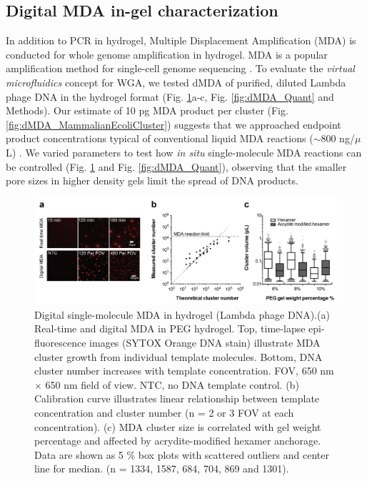 \subsection{Digital MDA in-gel characterization}
In addition to PCR in hydrogel, Multiple Displacement Amplification (MDA) is conducted for whole genome amplification in hydrogel. MDA \cite{Dean:2002us} is a popular amplification method for single-cell genome sequencing \cite{Marcy:2007il,Fu:2015gl,Zhang:2006hq,Raghunathan:2005fg,Pamp:2012cj,Dodsworth:2013ih,Hess:2011gu}. To evaluate the \textit{virtual microfluidics} concept for WGA, we tested dMDA \cite{Morinishi:2015jx,Blainey:2011dt} of purified, diluted Lambda phage DNA in the hydrogel format (Fig. \ref{fig:dMDA}a-c, Fig. \ref{fig:dMDA_Quant} and Methods). Our estimate of 10 pg MDA product per cluster (Fig. \ref{fig:dMDA_MammalianEcoliCluster}) suggests that we approached endpoint product concentrations typical of conventional liquid MDA reactions (\ensuremath{\sim}800 ng\slash $\mu$L) \cite{Blainey:2013dp}. We varied parameters to test how \textit{in situ} single-molecule MDA reactions can be controlled (Fig. \ref{fig:dMDA} and Fig. \ref{fig:dMDA_Quant}), observing that the smaller pore sizes in higher density gels limit the spread of DNA products.

\begin{figure}
\centering
\includegraphics[keepaspectratio,width=1\textwidth]{./figures/Thesis-21.png}
\caption[Digital single-molecule MDA in hydrogel (Lambda phage DNA).]{Digital single-molecule MDA in hydrogel (Lambda phage DNA).(a) Real-time and digital MDA in PEG hydrogel. Top, time-lapse
epi-fluorescence images (SYTOX Orange DNA stain) illustrate MDA cluster growth from individual template molecules. Bottom, DNA cluster number increases with template concentration. FOV, 650 nm $\times$ 650 nm field of view. NTC, no DNA template control. (b) Calibration curve illustrates linear relationship between template concentration and cluster number (n = 2 or 3 FOV at
each concentration). (c) MDA cluster size is correlated with gel weight percentage and affected by acrydite-modified hexamer anchorage. Data are shown as 5 $\%$ box plots with scattered outliers and center line for median. (n = 1334, 1587, 684, 704, 869 and 1301).}
\label{fig:dMDA}
\end{figure}

